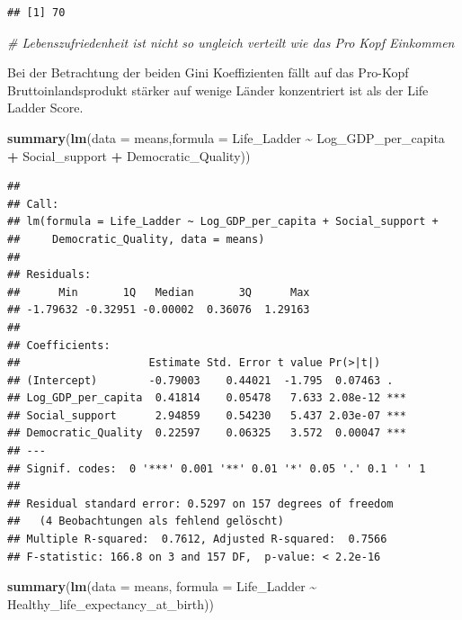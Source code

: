 \documentclass[
]{article}
\newenvironment{Shaded}{\begin{snugshade}}{\end{snugshade}}
\newcommand{\AttributeTok}[1]{\textcolor[rgb]{0.13,0.29,0.53}{#1}}
\newcommand{\CommentTok}[1]{\textcolor[rgb]{0.56,0.35,0.01}{\textit{#1}}}
\newcommand{\FunctionTok}[1]{\textcolor[rgb]{0.13,0.29,0.53}{\textbf{#1}}}
\newcommand{\NormalTok}[1]{#1}
\newcommand{\SpecialCharTok}[1]{\textcolor[rgb]{0.81,0.36,0.00}{\textbf{#1}}}
\begin{document}
\begin{verbatim}
## [1] 70
\end{verbatim}

\begin{Shaded}
\begin{Highlighting}[]
\CommentTok{\# Lebenszufriedenheit ist nicht so ungleich verteilt wie das Pro Kopf Einkommen}
\end{Highlighting}
\end{Shaded}

Bei der Betrachtung der beiden Gini Koeffizienten fällt auf das Pro-Kopf
Bruttoinlandsprodukt stärker auf wenige Länder konzentriert ist als der
Life Ladder Score.

\begin{Shaded}
\begin{Highlighting}[]
\FunctionTok{summary}\NormalTok{(}\FunctionTok{lm}\NormalTok{(}\AttributeTok{data =}\NormalTok{ means,}\AttributeTok{formula =}\NormalTok{ Life\_Ladder }\SpecialCharTok{\textasciitilde{}}\NormalTok{ Log\_GDP\_per\_capita }\SpecialCharTok{+}\NormalTok{ Social\_support }\SpecialCharTok{+}\NormalTok{ Democratic\_Quality))}
\end{Highlighting}
\end{Shaded}

\begin{verbatim}
## 
## Call:
## lm(formula = Life_Ladder ~ Log_GDP_per_capita + Social_support + 
##     Democratic_Quality, data = means)
## 
## Residuals:
##      Min       1Q   Median       3Q      Max 
## -1.79632 -0.32951 -0.00002  0.36076  1.29163 
## 
## Coefficients:
##                    Estimate Std. Error t value Pr(>|t|)    
## (Intercept)        -0.79003    0.44021  -1.795  0.07463 .  
## Log_GDP_per_capita  0.41814    0.05478   7.633 2.08e-12 ***
## Social_support      2.94859    0.54230   5.437 2.03e-07 ***
## Democratic_Quality  0.22597    0.06325   3.572  0.00047 ***
## ---
## Signif. codes:  0 '***' 0.001 '**' 0.01 '*' 0.05 '.' 0.1 ' ' 1
## 
## Residual standard error: 0.5297 on 157 degrees of freedom
##   (4 Beobachtungen als fehlend gelöscht)
## Multiple R-squared:  0.7612, Adjusted R-squared:  0.7566 
## F-statistic: 166.8 on 3 and 157 DF,  p-value: < 2.2e-16
\end{verbatim}

\begin{Shaded}
\begin{Highlighting}[]
\FunctionTok{summary}\NormalTok{(}\FunctionTok{lm}\NormalTok{(}\AttributeTok{data =}\NormalTok{ means, }\AttributeTok{formula =}\NormalTok{ Life\_Ladder }\SpecialCharTok{\textasciitilde{}}\NormalTok{ Healthy\_life\_expectancy\_at\_birth))}
\end{Highlighting}
\end{Shaded}
\end{document}
